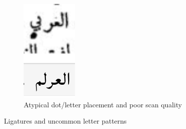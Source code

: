 \begin{figure}[h]
	\begin{subfigure}[b]{0.3\linewidth}
	\centering
	\includegraphics[width=\linewidth]{images/image25.png}
	\caption{Atypical dot/letter placement and poor scan quality}
	\label{fig:fig14}
	\end{subfigure}
	\caption{Ligatures and uncommon letter patterns}
	\label{fig:fig914}
\end{figure}

